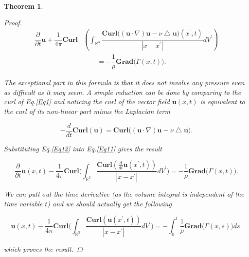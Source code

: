 \documentclass[amsmath,12pt,a4paper]{amsart}
\newtheorem{theorem}{Theorem}
\begin{document}
\begin{theorem}
\begin{proof}
\begin{equation}\label{Eq11}
\begin{split}
\dfrac{\partial }{\partial t} \textbf{u} + \dfrac{1}{4\pi}\textbf{Curl}&\left(\int_{\mathbb{R}^3}^{}{\dfrac{ \textbf{Curl}\bigl((\textbf{u}\cdot \nabla )\textbf{u} - \nu \bigtriangleup \textbf{u}\bigr)(x^\prime,t)}{|x-x^\prime|}}dV^\prime \right) \\
&\qquad= -\dfrac{1}{\rho}  \textbf{Grad}\big(\Gamma(x,t)).
\end{split}
\end{equation}

The exceptional part in this formula is that it does not involve any pressure even as difficult as it may seem.  A simple reduction can be done by comparing to the curl of Eq.\eqref{Eq1} and noticing the curl of the vector field $\textbf{u}(x,t)$ is equivalent to the curl of its non-linear part minus the Laplacian term


\begin{equation}\label{Eq12}
- \dfrac{d}{dt}\textbf{Curl}(\textbf{u}) = \textbf{Curl}\bigl(\left(\textbf{u}\cdot \nabla \right)\textbf{u} -\nu \bigtriangleup \textbf{u}\bigr).
\end{equation}

Substituting Eq.\eqref{Eq12} into Eq.\eqref{Eq11} gives the result 


\begin{equation}\label{Eq13}
\dfrac{\partial }{\partial t} \textbf{u}(x,t)- \dfrac{1}{4\pi}\textbf{Curl}\Biggl(\int_{\mathbb{R}^3}^{}{ \dfrac{ \textbf{Curl}(\frac{d}{dt}\textbf{u} (x^\prime,t))}{|x-x^\prime|}}dV^\prime\Biggr) = -\dfrac{1}{\rho}  \textbf{Grad}\big(\Gamma(x,t)\big).
\end{equation}

We can pull out the time derivative (as the volume integral is independent of the time variable $t$) and we should actually get the following


\begin{equation}\label{Eq14}
 \textbf{u}(x,t)- \dfrac{1}{4\pi}\textbf{Curl}\Biggl( \int_{\mathbb{R}^3}^{}{\dfrac{\textbf{Curl} (\textbf{u} (x^\prime,t))}{|x-x^\prime|}}dV^\prime\Biggr) = -\int_{0}^{t}{\dfrac{1}{\rho}  \textbf{Grad}\big(\Gamma(x,s)\big)}ds.
\end{equation}

which proves the result.

\end{proof}
\end{theorem}
\end{document}
